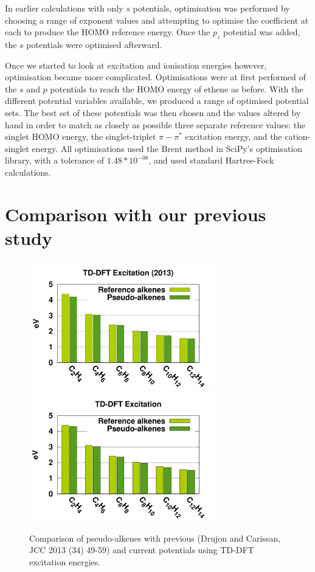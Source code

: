 \documentclass[aip]{revtex4-1}
\begin{document}
In earlier calculations with only \(s\) potentials, optimisation was performed by choosing a range of exponent values and attempting to optimise the coefficient at each to produce the HOMO reference energy. Once the \(p_{z}\) potential was added, the \(s\) potentials were optimised afterward. 

Once we started to look at excitation and ionisation energies however, optimisation became more complicated. Optimisations were at first performed of the $s$ and $p$ potentials to reach the HOMO energy of ethene as before. With the different potential variables available, we produced a range of optimised potential sets. The best set of these potentials was then chosen and the values altered by hand in order to match as closely as possible three separate reference values: the singlet HOMO energy, the singlet-triplet \(\pi-\pi^{*}\) excitation energy, and the cation-singlet energy. All optimisations used the Brent method in SciPy's optimisation library, with a tolerance of \(1.48*10^{-08}\), and used standard Hartree-Fock calculations.

\section*{Comparison with our previous study}
\begin{figure}
\begin{center}
\includegraphics[width=8cm]{short_pbe0_tddft_2013}
\includegraphics[width=8cm]{short_pbe0_tddft}
\end{center}
\caption{Comparison of pseudo-alkenes with previous (Drujon and Carissan, JCC 2013 (34) 49-59) and current potentials using TD-DFT excitation energies.}
\label{fig:alkenes_tddft}
\end{figure}
\end{document}
